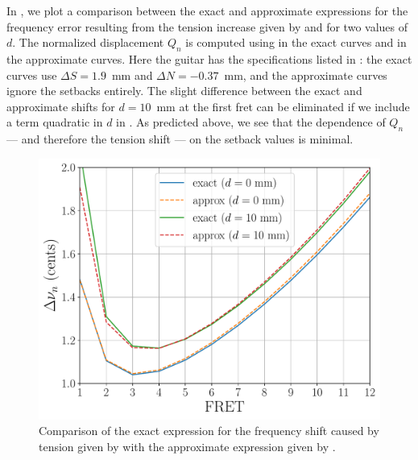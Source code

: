 In , we plot a comparison between the exact and approximate expressions for the frequency error resulting from the tension increase given by  and  for two values of $d$. The normalized displacement $Q_n$ is computed using  in the exact curves and  in the approximate curves. Here the guitar has the specifications listed in : the exact curves use $\Delta S = 1.9$~mm and $\Delta N = -0.37$~mm, and the approximate curves ignore the setbacks entirely. The slight difference between the exact and approximate shifts for $d = 10$~mm at the first fret can be eliminated if we include a term quadratic in $d$ in . As predicted above, we see that the dependence of $Q_n$ --- and therefore the tension shift --- on the setback values is minimal.

\begin{figure}
  \centering
  \includegraphics[width=5.0in]{figures/tnu_test}
  \caption{\label{fig:tnu_test} Comparison of the exact expression for the frequency shift caused by tension given by  with the approximate expression given by .}
\end{figure}

